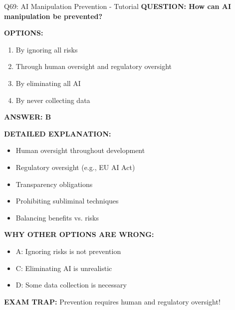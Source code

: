 \documentclass[8pt]{beamer}
\begin{document}
	\begin{frame}{Q69: AI Manipulation Prevention - Tutorial}
		\fontsize{6.5}{7.5}\selectfont
		\textbf{QUESTION: How can AI manipulation be prevented?}
		
		\vspace{0.1cm}
		\textbf{OPTIONS:}
		\begin{enumerate}
			\item By ignoring all risks
			\item Through human oversight and regulatory oversight
			\item By eliminating all AI
			\item By never collecting data
		\end{enumerate}
		
		\vspace{0.1cm}
		\textcolor{myblue}{\textbf{ANSWER: B}}
		
		\vspace{0.1cm}
		\textbf{DETAILED EXPLANATION:}
		\begin{itemize}
			\item Human oversight throughout development
			\item Regulatory oversight (e.g., EU AI Act)
			\item Transparency obligations
			\item Prohibiting subliminal techniques
			\item Balancing benefits vs. risks
		\end{itemize}
		
		\vspace{0.1cm}
		\textcolor{myred}{\textbf{WHY OTHER OPTIONS ARE WRONG:}}
		\begin{itemize}
			\item \textcolor{myred}{A:} Ignoring risks is not prevention
			\item \textcolor{myred}{C:} Eliminating AI is unrealistic
			\item \textcolor{myred}{D:} Some data collection is necessary
		\end{itemize}
		
		\textcolor{myred}{\textbf{EXAM TRAP:}} Prevention requires \textcolor{myblue}{human and regulatory oversight}!
	\end{frame}
	
\end{document}
